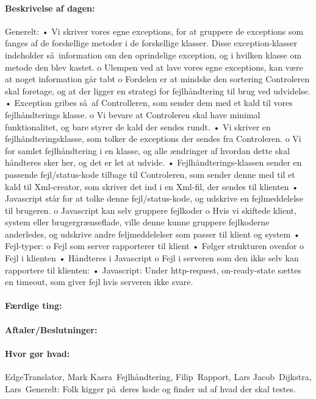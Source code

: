 \documentclass[a4paper,10pt,titlepage]{article}
\begin{document}
		\paragraph{Beskrivelse af dagen:}
		
		Generelt:
•	Vi skriver vores egne exceptions, for at gruppere de exceptions som fanges af de forskellige metoder i de forskellige klasser. Disse exception-klasser indeholder s\aa \ information om den oprindelige exception, og i hvilken klasse om metode den blev kastet. 
o	Ulempen ved at lave vores egne exceptions, kan v\ae re at noget information g\aa r tabt
o	Fordelen er at mindske den sortering Controleren skal foretage, og at der ligger en strategi for fejlh\aa ndtering til brug ved udvidelse.
•	Exception gribes s\aa \ af Controlleren, som sender dem med et kald til vores fejlh\aa ndterings klasse.
o	Vi bevare at Controleren skal have minimal funktionalitet, og bare styrer de kald der sendes rundt.
•	Vi skriver en fejlh\aa ndteringsklasse, som tolker de exceptions der sendes fra Controleren.
o	Vi for samlet fejlh\aa ndtering i en klasse, og alle \ae ndringer af hvordan dette skal h\aa ndteres sker her, og det er let at udvide.
•	Fejlh\aa ndterings-klassen sender en passende fejl/status-kode tilbage til Controleren, som sender denne med til et kald til Xml-creator, som skriver det ind i en Xml-fil, der sendes til klienten
•	Javascript st\aa r for at tolke denne fejl/status-kode, og udskrive en fejlmeddelelse til brugeren.
o	Javascript kan selv gruppere fejlkoder
o	Hvis vi skiftede klient, system eller brugergr\ae nseflade, ville denne kunne gruppere fejlkoderne anderledes, og udskrive andre feljmeddelelser som passer til klient og system 
•	Fejl-typer:
o	Fejl som server rapporterer til klient
•	F\o lger strukturen ovenfor
o	Fejl i klienten	
•	H\aa ndteres i Javascript
o	Fejl i serveren som den ikke selv kan rapportere til klienten:
•	Javascript: Under http-request, on-ready-state s\ae ttes en timeout, som giver fejl hvis serveren ikke svare.

		\paragraph{F\ae rdige ting:}
		
		\paragraph{Aftaler/Beslutninger:}
		
		\paragraph{Hvor g\o r hvad:}
		EdgeTranslator, Mark Kasra\
Fejlh\aa ndtering, Filip\
Rapport, Lars Jacob\
Dijkstra, Lars\
Generelt: Folk kigger p\aa \ deres kode og finder ud af hvad der skal testes.
\end{document}
